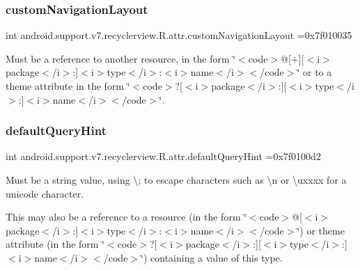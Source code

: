 \subsubsection{\texorpdfstring{custom\+Navigation\+Layout}{customNavigationLayout}}
{\footnotesize\ttfamily int android.\+support.\+v7.\+recyclerview.\+R.\+attr.\+custom\+Navigation\+Layout =0x7f010035\hspace{0.3cm}{\ttfamily [static]}}

Must be a reference to another resource, in the form \char`\"{}$<$code$>$@\mbox{[}+\mbox{]}\mbox{[}$<$i$>$package$<$/i$>$\+:\mbox{]}$<$i$>$type$<$/i$>$\+:$<$i$>$name$<$/i$>$$<$/code$>$\char`\"{} or to a theme attribute in the form \char`\"{}$<$code$>$?\mbox{[}$<$i$>$package$<$/i$>$\+:\mbox{]}\mbox{[}$<$i$>$type$<$/i$>$\+:\mbox{]}$<$i$>$name$<$/i$>$$<$/code$>$\char`\"{}. \mbox{\label{classandroid_1_1support_1_1v7_1_1recyclerview_1_1R_1_1attr_a699cb8d984d3bc2b3c965ecf22cb6300}} 
\subsubsection{\texorpdfstring{default\+Query\+Hint}{defaultQueryHint}}
{\footnotesize\ttfamily int android.\+support.\+v7.\+recyclerview.\+R.\+attr.\+default\+Query\+Hint =0x7f0100d2\hspace{0.3cm}{\ttfamily [static]}}

Must be a string value, using \textquotesingle{}\textbackslash{};\textquotesingle{} to escape characters such as \textquotesingle{}\textbackslash{}n\textquotesingle{} or \textquotesingle{}\textbackslash{}uxxxx\textquotesingle{} for a unicode character. 

This may also be a reference to a resource (in the form \char`\"{}$<$code$>$@\mbox{[}$<$i$>$package$<$/i$>$\+:\mbox{]}$<$i$>$type$<$/i$>$\+:$<$i$>$name$<$/i$>$$<$/code$>$\char`\"{}) or theme attribute (in the form \char`\"{}$<$code$>$?\mbox{[}$<$i$>$package$<$/i$>$\+:\mbox{]}\mbox{[}$<$i$>$type$<$/i$>$\+:\mbox{]}$<$i$>$name$<$/i$>$$<$/code$>$\char`\"{}) containing a value of this type. \mbox{\label{classandroid_1_1support_1_1v7_1_1recyclerview_1_1R_1_1attr_a12eca7ada475c5e6588bb3bb5a81d44e}} 
